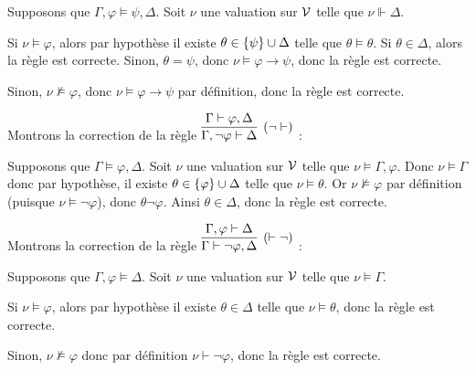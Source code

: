 \documentclass[a4paper,french,bookmarks]{article}
\begin{document}
\begin{enumerate}
{\begin{enumerate}
                Supposons que $\Gamma, \varphi \vDash \psi, \Delta$. Soit $\nu$ une valuation sur $\mathcal{V}$ telle que $\nu \Vdash \Delta$. 
                \begin{enumerate}
                    \ithand Si $\nu \vDash \varphi$, alors par hypothèse il existe $\theta \in \left\{\psi\right\} \cup \Delta$ telle que $\theta \vDash \theta$. Si $\theta \in \Delta$, alors la règle est correcte. Sinon, $\theta = \psi$, donc $\nu \vDash \varphi \rightarrow \psi$, donc la règle est correcte.
                    
                    \ithand Sinon, $\nu \nvDash \varphi$, donc $\nu \vDash \varphi \rightarrow \psi$ par définition, donc la règle est correcte.
                \end{enumerate}
                \medskip
                
                \itt Montrons la correction de la règle $\infer[(\neg \vdash)]{\Gamma, \neg \varphi \vdash \Delta}{\Gamma \vdash \varphi, \Delta}$ :
                
                Supposons que $\Gamma \vDash \varphi, \Delta$. Soit $\nu$ une valuation sur $\mathcal{V}$ telle que $\nu \vDash \Gamma, \varphi$. Donc $\nu \vDash \Gamma$ donc par hypothèse, il existe $\theta \in \left\{\varphi\right\} \cup \Delta$ telle que $\nu \vDash \theta$. Or $\nu \nvDash \varphi$ par définition (puisque $\nu \vDash \neg \varphi$), donc $\theta \neg \varphi$. Ainsi $\theta \in \Delta$, donc la règle est correcte.\medskip
                
                \itt Montrons la correction de la règle $\infer[(\vdash \neg)]{\Gamma \vdash \neg \varphi, \Delta}{\Gamma, \varphi \vdash \Delta}$ :
                
                Supposons que $\Gamma, \varphi \vDash \Delta$. Soit $\nu$ une valuation sur $\mathcal{V}$ telle que $\nu \vDash \Gamma$.
                \begin{enumerate}
                    \ithand Si $\nu \vDash \varphi$, alors par hypothèse il existe $\theta \in \Delta$ telle que $\nu \vDash \theta$, donc la règle est correcte.
                    
                    \ithand Sinon, $\nu \nvDash \varphi$ donc par définition $\nu \vdash \neg \varphi$, donc la règle est correcte.
                \end{enumerate}
            \end{enumerate}
        }
        \nobefore\yesafter
        \yesbefore
        

\end{enumerate}
\end{document}
